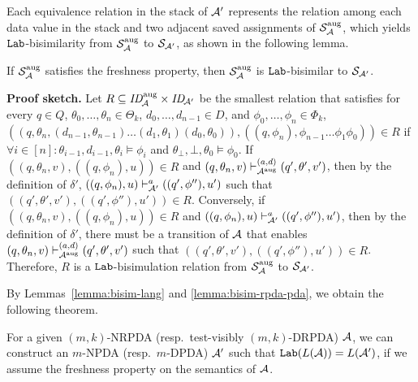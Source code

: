 %
Each equivalence relation in the stack of ${\cal A}'$ represents
the relation among each data value in the stack and
two adjacent saved assignments
of ${\cal S}_{{\cal A}}^{\mathrm{aug}}$,
which yields $\mathtt{Lab}$-bisimilarity from
${\cal S}_{{\cal A}}^{\mathrm{aug}}$ to ${\cal S}_{{\cal A}'}$,
as shown in the following lemma.
%
\begin{lemma}\label{lemma:bisim-rpda-pda}
If ${\cal S}_{{\cal A}}^{\mathrm{aug}}$ satisfies the freshness property, then
${\cal S}_{{\cal A}}^{\mathrm{aug}}$ is $\mathtt{Lab}$-bisimilar to
${\cal S}_{{\cal A}'}$.
\end{lemma}
%
{\bf Proof sketch.}\quad
Let $R\subseteq \mathit{ID}_{\!{\cal A}}^{\mathrm{aug}}\times\mathit{ID}_{\!{\cal A}'}$
be the smallest relation
that satisfies
for every $q\in Q$, $\theta_0,\ldots,\theta_n\in\Theta_k$,
$d_0,\ldots,d_{n-1}\in D$, and $\phi_0,\ldots,\phi_n\in\Phi_k$,
$((q,\theta_n,(d_{n-1},\theta_{n-1})\allowbreak\ldots\allowbreak
(d_1,\theta_1)(d_0,\theta_0)),
((q,\phi_n),\phi_{n-1}\ldots\phi_1\phi_0))\in R$
if
$\forall i\in[n]: \theta_{i-1},d_{i-1},\theta_i\models\phi_i$ and
$\theta_{\bot},{\bot},\theta_0\models\phi_0$.
%
If
$((q,\theta_n,v), ((q,\phi_n),u))\in R$ and
$(q,\theta_n,v)\vdash_{{\cal A}^{\mathrm{aug}}}^{(a,d)}(q',\theta',v')$,
then by the definition of $\delta'$,
$((q,\phi_n),u)\vdash_{{\cal A}'}^a ((q',\phi''),u')$
such that $((q',\theta',v'), ((q',\phi''),u'))\in R$.
Conversely, if
$((q,\theta_n,v),\allowbreak ((q,\phi_n),u))\in R$ and
$((q,\phi_n),u)\vdash_{{\cal A}'}^a ((q',\phi''),u')$,
then by the definition of $\delta'$,
there must be a transition of ${\cal A}$ that enables
$(q,\theta_n,v)\vdash_{{\cal A}^{\mathrm{aug}}}^{(a,d)} (q',\theta',v')$
such that $((q',\theta',v'), ((q',\phi''),u'))\in R$.
%
Therefore, $R$ is a $\mathtt{Lab}$-bisimulation relation from
${\cal S}_{{\cal A}}^{\mathrm{aug}}$ to ${\cal S}_{{\cal A}'}$.

\smallskip

By Lemmas~\ref{lemma:bisim-lang} and \ref{lemma:bisim-rpda-pda},
we obtain the following theorem.
\begin{theorem}
\label{the: RPDAtoPDA}
For a given $(m,k)$-NRPDA (resp.\ test-visibly $(m,k)$-DRPDA) ${\cal A}$,
we can construct an $m$-NPDA (resp.\ $m$-DPDA) ${\cal A}'$
such that $\mathtt{Lab}(L({\cal A}))=L({\cal A}')$,
if we assume the freshness property on the semantics of ${\cal A}$.
\end{theorem}
